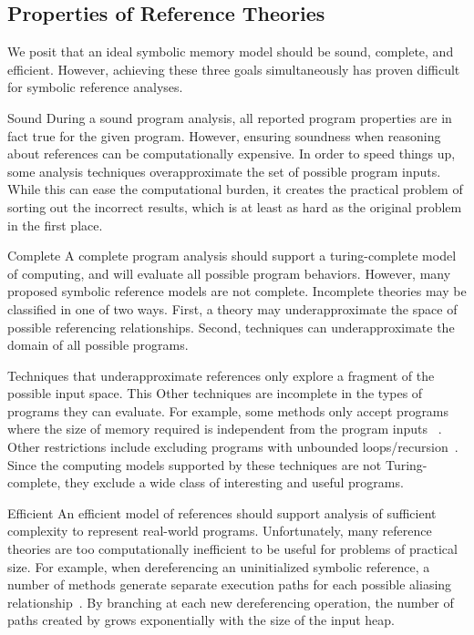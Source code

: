 



\subsection{Properties of Reference Theories}

We posit that an ideal symbolic memory model should be sound, complete, and efficient. However, achieving these three goals simultaneously has proven difficult for symbolic reference analyses.

\begin{compactdesc}
\item[Sound]
During a sound program analysis, all reported program properties are in fact true for the given program. However, ensuring soundness when reasoning about references can be computationally expensive. In order to speed things up, some analysis techniques overapproximate the set of possible program inputs. While this can ease the computational burden, it creates the practical problem of sorting out the incorrect results, which is at least as hard as the original problem in the first place.

\item[Complete] 
A complete program analysis should support a turing-complete model of computing, and will evaluate all possible program behaviors. However, many proposed symbolic reference models are not complete. Incomplete theories may be classified in one of two ways. First, a theory may underapproximate the space of possible referencing relationships. Second, techniques can underapproximate the domain of all possible programs.

Techniques that underapproximate references only explore a fragment of the possible input space. This
Other techniques are incomplete in the types of programs they can evaluate. For example, some methods only accept programs where the size of memory required is independent from the program inputs ~\cite{Barnett:2006,Elkarablieh:2009}. Other restrictions include excluding programs with unbounded loops/recursion~\cite{Clarke:2004,Torlak:2014}. Since the computing models supported by these techniques are not Turing-complete, they exclude a wide class of interesting and useful programs. 

\item[Efficient]
An efficient model of references should support analysis of sufficient complexity to represent real-world programs. Unfortunately, many reference theories are too computationally inefficient to be useful for problems of practical size. For example, when dereferencing an uninitialized symbolic reference, a number of methods generate separate execution paths for each possible aliasing relationship~\cite{GSE03,KiasanKunit,Cadar:2008}. By branching at each new dereferencing operation, the number of paths created by grows exponentially with the size of the input heap.

\end{compactdesc}

